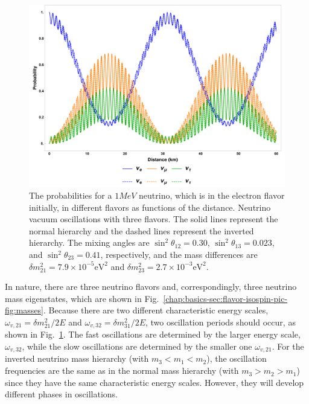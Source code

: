 \begin{figure}
    \centering
    \includegraphics[width=\textwidth]{chapters/assets/basics/vacuum-oscillations-3-flavor.pdf}
    \caption{The probabilities for a $1MeV$ neutrino, which is in the electron flavor initially, in different flavors as functions of the distance. Neutrino vacuum oscillations with three flavors. The solid lines represent the normal hierarchy and the dashed lines represent the inverted hierarchy. The mixing angles are $\sin^2\theta_{12}=0.30$, $\sin^2\theta_{13}=0.023$, and $\sin^2\theta_{23}=0.41$, respectively, and the mass differences are $\delta m_{21}^2 = 7.9\times 10^{-5}\mathrm{eV^2}$ and $\delta m^2_{23}=2.7\times 10^{-3}\mathrm{eV^2}$.}
    \label{chap:basics-section:neutrinos-fig:vacuum-3-flavor-osc}
\end{figure}


In nature, there are three neutrino flavors and, correspondingly, three neutrino mass eigenstates, which are shown in Fig.~\ref{chap:basics-sec:flavor-isospin-pic-fig:masses}. Because there are two different characteristic energy scales, $\omega_{v,21}=\delta m_{21}^2/2E$ and $\omega_{v,32}=\delta m_{31}^2/2E$, two oscillation periods should occur, as shown in Fig.~\ref{chap:basics-section:neutrinos-fig:vacuum-3-flavor-osc}. The fast oscillations are determined by the larger energy scale, $\omega_{v,32}$, while the slow oscillations are determined by the smaller one $\omega_{v,21}$. For the inverted neutrino mass hierarchy (with $m_3 < m_1 < m_2$), the oscillation frequencies are the same as in the normal mass hierarchy (with $m_3>m_2>m_1$) since they have the same characteristic energy scales. However, they will develop different phases in oscillations.


